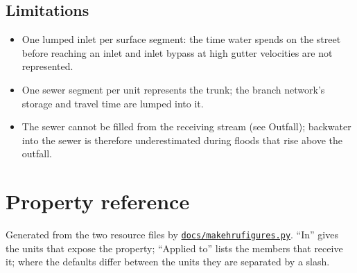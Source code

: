 \documentclass[11pt,a4paper]{article}
\newcommand{\file}[1]{\texttt{\small #1}}
\renewcommand{\_}{\oldus\allowbreak}   %
\newcommand{\ghbase}{https://github.com/ArashMassoudieh/OpenHydroQual/blob/master}
\newcommand{\exfile}[1]{\href{\ghbase/#1}{\file{#1}}}
\begin{document}
\subsection{Limitations}
\begin{itemize}[nosep]
  \item One lumped inlet per surface segment: the time water spends on the street before reaching an
        inlet and inlet bypass at high gutter velocities are not represented.
  \item One sewer segment per unit represents the trunk; the branch network's storage and travel
        time are lumped into it.
  \item The sewer cannot be filled from the receiving stream (see Outfall); backwater into the sewer
        is therefore underestimated during floods that rise above the outfall.
\end{itemize}

\section{Property reference}
\label{sec:reference}
Generated from the two resource files by \exfile{docs/make\_hru\_figures.py}. ``In'' gives the units
that expose the property; ``Applied to'' lists the members that receive it; where the defaults differ
between the units they are separated by a slash.

{\small

}

\end{document}
